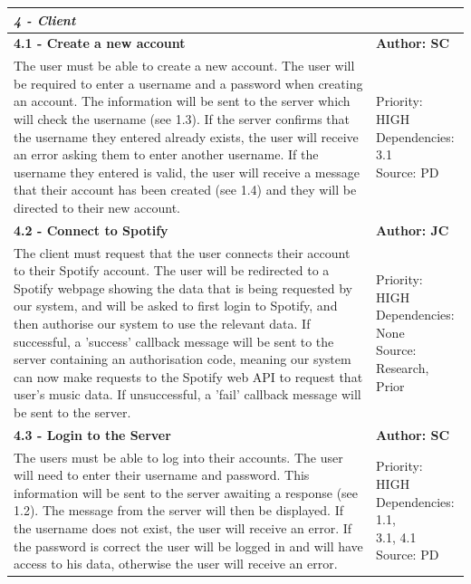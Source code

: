 \documentclass[10pt, notitlepage]{report}
\begin{document}
\begin{center}
\begin{longtable}{| p{13cm} | p{3cm} |}
\multicolumn{2}{|l|}{\textbf{\textit{4 - Client}}} \\
\hline
\textbf{4.1 - Create a new account} & \textbf{Author: SC} \\
\hline
The user must be able to create a new account. The user will be required to enter a username and a password when creating an account. The information will be sent to the server which will check the username (see 1.3). If the server confirms that the username they entered already exists, the user will receive an error asking them to enter another username. If the username they entered is valid, the user will receive a message that their account has been created (see 1.4) and they will be directed to their new account. & 
\makecell{Priority: HIGH\\Dependencies: 3.1\\Source: PD} \\
\hline
\textbf{4.2 - Connect to Spotify} & \textbf{Author: JC} \\
\hline
The client must request that the user connects their account to their Spotify account. The user will be redirected to a Spotify webpage showing the data that is being requested by our system, and will be asked to first login to Spotify, and then authorise our system to use the relevant data. If successful, a 'success' callback message will be sent to the server containing an authorisation code, meaning our system can now make requests to the Spotify web API to request that user's music data. If unsuccessful, a 'fail' callback message will be sent to the server.& 
\makecell{Priority: HIGH\\Dependencies: None\\Source: Research,\\Prior} \\
\hline
\textbf{4.3 - Login to the Server} & \textbf{Author: SC} \\
\hline
The users must be able to log into their accounts. The user will need to enter their username and password. This information will be sent to the server awaiting a response (see 1.2). The message from the server will then be displayed. If the username does not exist, the user will receive an error. If the password is correct the user will be logged in and will have access to his data, otherwise the user will receive an error. &
\makecell{Priority: HIGH\\Dependencies: 1.1,\\ 3.1, 4.1\\Source: PD}\\

\end{longtable}
\end{center}
\end{document}
